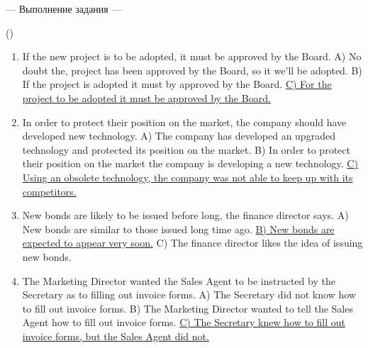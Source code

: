 \documentclass[main.tex]{subfiles}
\begin{document}

\hypertarget{ltask:2024-04-03-1}{--- Выполнение задания ---} (\hyperref[task:2024-04-03-1]{\color{blue}{перейти к тексту задания}})
\\

\vspace{5pt}
\begin{enumerate}[nosep, leftmargin=*]
	\itemsep15pt
	\item If the new project is to be adopted, it must be approved by the Board.\newline
		A) No doubt the, project has been approved by the Board, so it we'll be adopted.\newline
		B) If the project is adopted it must by approved by the Board.\newline
		\uline{C) For the project to be adopted it must be approved by the Board.}
	\item In order to protect their position on the market, the company should have developed new technology.\newline
		A) The company has developed an upgraded technology and protected its position on the market.\newline
		B) In order to protect their position on the market the company is developing a new technology.\newline
		\uline{C) Using an obsolete technology, the company was not able to keep up with its competitors.}
	\item New bonds are likely to be issued before long, the finance director says.\newline
		A) New bonds are similar to those issued long time ago.\newline
		\uline{B) New bonds are expected to appear very soon.}\newline
		C) The finance director likes the idea of issuing new bonds.
	\item The Marketing Director wanted the Sales Agent to be instructed by the Secretary as to filling out invoice forms.\newline
		A) The Secretary did not know how to fill out invoice forms.\newline
		B) The Marketing Director wanted to tell the Sales Agent how to fill out invoice forms.\newline
		\uline{C) The Secretary knew how to fill out invoice forms, but the Sales Agent did not.}

\end{enumerate}
\end{document}
